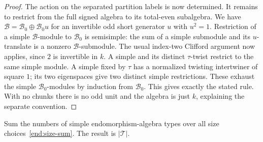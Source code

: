 \begin{proof}
The action on the separated partition labels is now determined.
It remains to restrict from the full signed algebra to its
total-even subalgebra.
We have $\mathcal B=\mathcal B_0\oplus\mathcal B_0u$ for an
invertible odd short generator $u$ with $u^2=1$.  Restriction
of a simple $\mathcal B$-module to $\mathcal B_0$ is semisimple:
the sum of a simple submodule and its $u$-translate is a
nonzero $\mathcal B$-submodule.  The usual index-two Clifford
argument now applies, since $2$ is invertible in $k$.  A
simple and its distinct $\tau$-twist restrict to the same
simple module.  A simple fixed by $\tau$ has a normalized
twisting intertwiner of square $1$; its two eigenspaces give
two distinct simple restrictions.  These exhaust the simple
$\mathcal B_0$-modules by induction from $\mathcal B_0$.
This gives exactly the stated rule.  With no chunks there is
no odd unit and the algebra is just $k$, explaining the
separate convention.
\end{proof}

\begin{lemma}\label{end:count}
Sum the numbers of simple endomorphism-algebra types over all
size choices~\eqref{end:size-sum}.  The result is $|\mathcal T|$.
\end{lemma}

